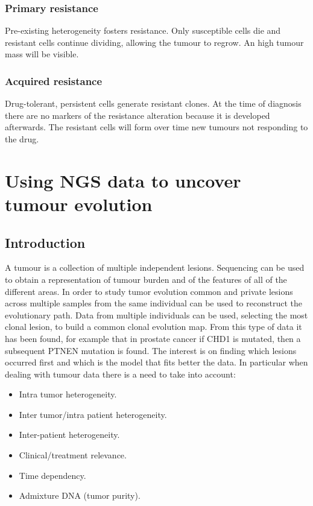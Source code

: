 		\subsubsection{Primary resistance}
		Pre-existing heterogeneity fosters resistance.
		Only susceptible cells die and resistant cells continue dividing, allowing the tumour to regrow.
		An high tumour mass will be visible.

		\subsubsection{Acquired resistance}
		Drug-tolerant, persistent cells generate resistant clones.
		At the time of diagnosis there are no markers of the resistance alteration because it is developed afterwards.
		The resistant cells will form over time new tumours not responding to the drug.

\section{Using NGS data to uncover tumour evolution}

	\subsection{Introduction}
	A tumour is a collection of multiple independent lesions.
	Sequencing can be used to obtain a representation of tumour burden and of the features of all of the different areas.
	In order to study tumor evolution common and private lesions across multiple samples from the same individual can be used to reconstruct the evolutionary path.
	Data from multiple individuals can be used, selecting the most clonal lesion, to build a common clonal evolution map.
	From this type of data it has been found, for example that in prostate cancer if CHD1 is mutated, then a subsequent PTNEN mutation is found.
	The interest is on finding which lesions occurred first and which is the model that fits better the data.
	In particular when dealing with tumour data there is a need to take into account:

	\begin{multicols}{2}
		\begin{itemize}
		\item Intra tumor heterogeneity.
		\item Inter tumor/intra patient heterogeneity.
		\item Inter-patient heterogeneity.
		\item Clinical/treatment relevance.
		\item Time dependency.
		\item Admixture DNA (tumor purity).
		\end{itemize}
	\end{multicols}

